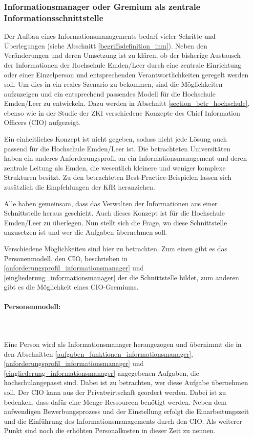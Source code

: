 \subsubsection{Informationsmanager oder Gremium als zentrale Informationsschnittstelle}
\label{subsubsection_cio_gremium}

Der Aufbau eines Informationsmanagements bedarf vieler Schritte und Überlegungen (siehe Abschnitt \ref{begriffsdefinition_inm}). Neben den Veränderungen und deren Umsetzung ist zu klären, ob der bisherige Austausch der Informationen der Hochschule Emden/Leer durch eine zentrale Einrichtung oder einer Einzelperson und entsprechenden Verantwortlichkeiten geregelt werden soll. Um dies in ein reales Szenario zu bekommen, sind die Möglichkeiten aufzuzeigen und ein entsprechend passendes Modell für die Hochschule Emden/Leer zu entwickeln. Dazu werden in Abschnitt  \ref{section_betr_hochschule}, ebenso wie in der Studie der ZKI verschiedene Konzepte des Chief Information Officers (CIO) aufgezeigt.

Ein einheitliches Konzept ist nicht gegeben, sodass nicht jede Lösung auch passend für die Hochschule Emden/Leer ist. Die betrachteten Universitäten haben ein anderes Anforderungsprofil an ein Informationsmanagement und deren zentrale Leitung als Emden, die wesentlich kleinere und weniger komplexe Strukturen besitzt. Zu den betrachteten Best-Practice-Beispielen lassen sich zusätzlich die Empfehlungen der KfR heranziehen. 

Alle haben gemeinsam, dass das Verwalten der Informationen aus einer Schnittstelle heraus geschieht. Auch dieses Konzept ist für die Hochschule Emden/Leer zu überlegen. Nun stellt sich die Frage, wo diese Schnittstelle anzusetzen ist und wer die Aufgaben übernehmen soll.

Verschiedene Möglichkeiten sind hier zu betrachten. Zum einen gibt es das Personenmodell, den CIO, beschrieben in \ref{anforderungsprofil_informationsmanager} und \ref{eingliederung_informationsmanager} der die Schnittstelle bildet, zum anderen gibt es die Möglichkeit eines CIO-Gremiums. 

\paragraph*{Personenmodell:}\mbox{}\\\\
Eine Person wird als Informationsmanager herangezogen und übernimmt die in den Abschnitten \ref{aufgaben_funktionen_informationsmanager}, \ref{anforderungsprofil_informationsmanager} und \ref{eingliederung_informationsmanager} angegebenen Aufgaben, die hochschulangepasst sind. Dabei ist zu betrachten, wer diese Aufgabe übernehmen soll. Der CIO kann aus der Privatwirtschaft geordert werden. Dabei ist zu bedenken, dass dafür eine Menge Ressourcen benötigt werden. Neben dem aufwendigen Bewerbungsprozess und der Einstellung erfolgt die Einarbeitungszeit und die Einführung des Informationsmanagements durch den CIO. Als weiterer Punkt sind noch die erhöhten Personalkosten in dieser Zeit zu nennen.

